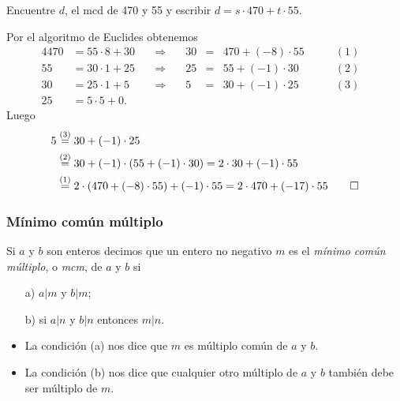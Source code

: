 \documentclass[handout]{beamer} %
\begin{document}
    \begin{frame}
        \begin{ejemplo} Encuentre $d$, el mcd de 470 y 55 y escribir $d = s \cdot 470 + t \cdot 55$.
        \end{ejemplo} \pause
        \begin{solucion}\pause
            Por el algoritmo de Euclides obtenemos
            \begin{alignat*}4
                470&=55 \cdot 8 +30&\quad\Rightarrow\quad &30 &=&470 + (-8)\cdot 55&\qquad (1)&\\
                55&=30 \cdot 1 + 25&\quad\Rightarrow\quad &25 &=&55 +(-1)\cdot 30&\qquad (2)&\\
                30&=25 \cdot 1+5&\quad\Rightarrow\quad &5 &=&30 +(-1) \cdot 25&\qquad (3)& \\
                25&=5\cdot 5+0.&&&&&&
            \end{alignat*}\pause
            Luego
            \begin{align*}
                5 &\stackrel{(3)}{=} 30 +(-1) \cdot 25\\
                &\stackrel{(2)}{=} 30 + (-1) \cdot (55 +(-1)\cdot 30) = 2 \cdot 30 + (-1) \cdot 55 \\   
                &\stackrel{(1)}{=}  2 \cdot (470 + (-8)\cdot 55) + (-1) \cdot 55 = 2 \cdot 470 +(-17)\cdot 55    \qed\\    
            \end{align*}
        
        \end{solucion}    
        
    \end{frame}
    
    
    \begin{frame}\frametitle{Mínimo común múltiplo}
        
        
        \begin{definicion}
            Si $a$ y $b$ son enteros decimos que un entero no negativo $m$ es el {\em
                mínimo común múltiplo}, o {\em mcm}, de $a$ y $b$ si
            \begin{enumerate}
                \item[a)] $ a|m$ y $b|m$;
                \item[b)] si $ a|n $ y $b|n$ entonces $ m|n$.
            \end{enumerate}
        \end{definicion}\pause
        \vskip 0.6cm
        \begin{itemize}
            \item La condición (a) nos dice que $m$ es múl\-ti\-plo común de $a$ y $b$. 
            \item La condición (b) nos dice que cualquier otro múltiplo de $a$ y $b$ también debe ser múltiplo de $m$.
        \end{itemize}
        
    \end{frame}
    
\end{document}
